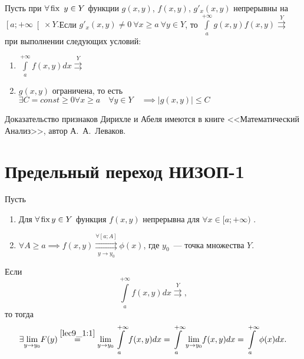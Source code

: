 \documentclass[../../main.tex]{subfiles}
\begin{document}
\begin{thm}

Пусть при $\forall \operatorname{fix} \ y \in Y $ функции $g(x,y)$, $f(x,y)$, $g'_x(x,y)$ 
непрерывны на $\left[a;+\infty\right[\times Y.$Если $ g'_x(x,y) \not = 0\ 
\forall x 
\ge a \ \forall y \in Y $, то $\int\limits_a^{+\infty} g(x,y)f(x,y) 
\overset{Y}{\rightrightarrows}$ при выполнении следующих условий:

\begin{enumerate}
\item $\int\limits_a^{+\infty}f(x,y)dx \overset{Y}{\rightrightarrows}$

\item $g(x,y)$ ограничена, то есть $\exists 
C = 
const \ge 0\forall x \ge a \quad \forall y \in Y 
\quad  \implies \left|g(x,y)\right| \le C $
\end{enumerate}
\end{thm}

Доказательство признаков Дирихле и Абеля имеются в книге <<Математический 
Анализ>>, автор А.~А.~Леваков.


\section{ Предельный переход НИЗОП-1}
\begin{thm}
Пусть

\begin{enumerate}
\item Для $\forall \operatorname{fix}  y \in Y$ функция $f(x,y)$ непрерывна для $\forall x 
\in 
[a;+\infty)$ 
.
\item $\forall A \ge a \implies f(x,y) \overset{\forall [a;A]}{\underset{y \to 
y_0}{\rightrightarrows}} \phi(x) $, где $y_0$~--- точка множества $Y$.
\end{enumerate}

Если \[\int\limits_a^{+\infty}f(x,y)dx \overset{Y}\rightrightarrows, \] то 
тогда 
\begin{equation}\label{lec10:12}
\exists \underset{y \to y_0}\lim F(y) \stk{lec9_1:1}= \underset{y \to 
y_0}\lim\int\limits_a^{+\infty}f(x,y)dx =\int\limits_a^{+\infty} \underset{y 
\to y_0}\lim f(x,y)dx = \int\limits_a^{+\infty}\phi(x)dx. \end{equation}
\end{thm}
\end{document}
